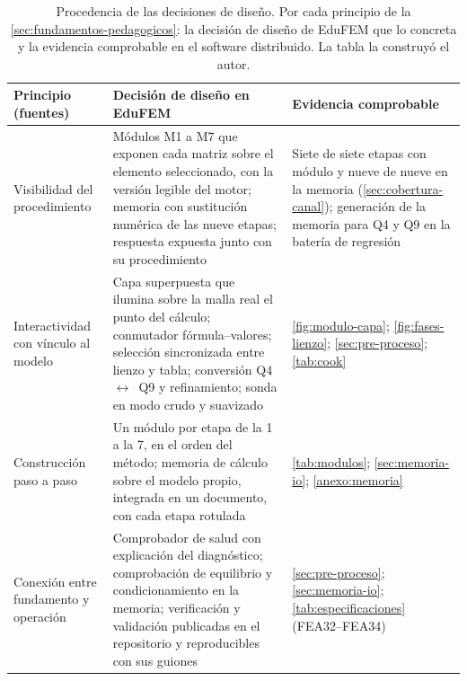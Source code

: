 \begin{table}[htbp]
\centering
\caption[Principios, decisiones de diseño y evidencia.]{Procedencia de las decisiones de diseño. Por cada principio de la \autoref{sec:fundamentos-pedagogicos}: la decisión de diseño de EduFEM que lo concreta y la evidencia comprobable en el software distribuido. La tabla la construyó el autor.}
\label{tab:principios}
{\footnotesize
\setlength{\tabcolsep}{3pt}
\renewcommand{\arraystretch}{1.12}
\begin{tabular}{@{}>{\raggedright\arraybackslash}p{3.4cm}>{\raggedright\arraybackslash}p{5.6cm}>{\raggedright\arraybackslash}p{5.4cm}@{}}
\toprule
\textbf{Principio (fuentes)} & \textbf{Decisión de diseño en EduFEM} & \textbf{Evidencia comprobable} \\
\midrule
Visibilidad del procedimiento \autocite[p.~157]{lee2015interactive} & Módulos M1 a M7 que exponen cada matriz sobre el elemento seleccionado, con la versión legible del motor; memoria con sustitución numérica de las nueve etapas; respuesta expuesta junto con su procedimiento & Siete de siete etapas con módulo y nueve de nueve en la memoria (\autoref{sec:cobertura-canal}); generación de la memoria para Q4 y Q9 en la batería de regresión \\
Interactividad con vínculo al modelo \autocite[pp.~163, 166]{lee2015interactive} & Capa superpuesta que ilumina sobre la malla real el punto del cálculo; conmutador fórmula--valores; selección sincronizada entre lienzo y tabla; conversión Q4~$\leftrightarrow$~Q9 y refinamiento; sonda en modo crudo y suavizado & \autoref{fig:modulo-capa}; \autoref{fig:fases-lienzo}; \autoref{sec:pre-proceso}; \autoref{tab:cook} \\
Construcción paso a paso \autocite[pp.~1010-1011, 1023]{bishay2020teaching} & Un módulo por etapa de la 1 a la 7, en el orden del método; memoria de cálculo sobre el modelo propio, integrada en un documento, con cada etapa rotulada & \autoref{tab:modulos}; \autoref{sec:memoria-io}; \autoref{anexo:memoria} \\
Conexión entre fundamento y operación \autocite[pp.~1159, 1168]{perezsantiago2023fem} & Comprobador de salud con explicación del diagnóstico; comprobación de equilibrio y condicionamiento en la memoria; verificación y validación publicadas en el repositorio y reproducibles con sus guiones & \autoref{sec:pre-proceso}; \autoref{sec:memoria-io}; \autoref{tab:especificaciones} (FEA32--FEA34) \\
\bottomrule
\end{tabular}}
\end{table}

